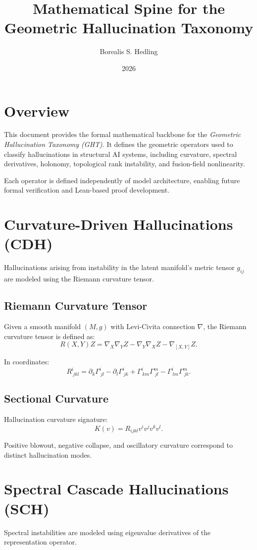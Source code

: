 \documentclass[11pt]{article}
\title{Mathematical Spine for the Geometric Hallucination Taxonomy}
\author{Borealis S. Hedling}
\date{2026}
\begin{document}
\maketitle

\section*{Overview}
This document provides the formal mathematical backbone for the 
\textit{Geometric Hallucination Taxonomy (GHT)}. 
It defines the geometric operators used to classify hallucinations in 
structural AI systems, including curvature, spectral derivatives, holonomy, 
topological rank instability, and fusion-field nonlinearity.

Each operator is defined independently of model architecture, enabling 
future formal verification and Lean-based proof development.

\section{Curvature-Driven Hallucinations (CDH)}
Hallucinations arising from instability in the latent manifold's metric tensor 
$g_{ij}$ are modeled using the Riemann curvature tensor.

\subsection{Riemann Curvature Tensor}
Given a smooth manifold $(M, g)$ with Levi-Civita connection $\nabla$, the 
Riemann curvature tensor is defined as:
\[
R(X,Y)Z = \nabla_X \nabla_Y Z - \nabla_Y \nabla_X Z - \nabla_{[X,Y]} Z.
\]

In coordinates:
\[
R^i_{\ jkl} = \partial_k \Gamma^i_{\ jl} - \partial_l \Gamma^i_{\ jk}
+ \Gamma^i_{\ km}\Gamma^m_{\ jl} - \Gamma^i_{\ lm}\Gamma^m_{\ jk}.
\]

\subsection{Sectional Curvature}
Hallucination curvature signature:
\[
K(v) = R_{ijkl} v^i v^j v^k v^l.
\]

Positive blowout, negative collapse, and oscillatory curvature correspond to 
distinct hallucination modes.

\section{Spectral Cascade Hallucinations (SCH)}
Spectral instabilities are modeled using eigenvalue derivatives of the 
representation operator.
\end{document}
